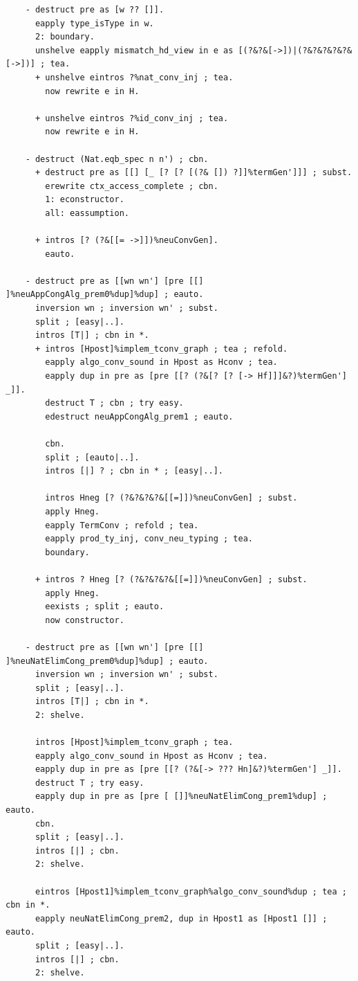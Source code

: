 \begin{lstlisting}
    - destruct pre as [w ?? []].
      eapply type_isType in w.
      2: boundary.
      unshelve eapply mismatch_hd_view in e as [(?&?&[->])|(?&?&?&?&?&[->])] ; tea.
      + unshelve eintros ?%nat_conv_inj ; tea.
        now rewrite e in H.

      + unshelve eintros ?%id_conv_inj ; tea.
        now rewrite e in H.

    - destruct (Nat.eqb_spec n n') ; cbn.
      + destruct pre as [[] [_ [? [? [(?& []) ?]]%termGen']]] ; subst.
        erewrite ctx_access_complete ; cbn.
        1: econstructor.
        all: eassumption.
        
      + intros [? (?&[[= ->]])%neuConvGen].
        eauto.
      
    - destruct pre as [[wn wn'] [pre [[] ]%neuAppCongAlg_prem0%dup]%dup] ; eauto.
      inversion wn ; inversion wn' ; subst.
      split ; [easy|..].
      intros [T|] ; cbn in *.
      + intros [Hpost]%implem_tconv_graph ; tea ; refold.
        eapply algo_conv_sound in Hpost as Hconv ; tea.
        eapply dup in pre as [pre [[? (?&[? [? [-> Hf]]]&?)%termGen'] _]].
        destruct T ; cbn ; try easy.
        edestruct neuAppCongAlg_prem1 ; eauto.

        cbn.
        split ; [eauto|..].
        intros [|] ? ; cbn in * ; [easy|..].

        intros Hneg [? (?&?&?&?&[[=]])%neuConvGen] ; subst.
        apply Hneg.
        eapply TermConv ; refold ; tea.
        eapply prod_ty_inj, conv_neu_typing ; tea.
        boundary.

      + intros ? Hneg [? (?&?&?&?&[[=]])%neuConvGen] ; subst.
        apply Hneg.
        eexists ; split ; eauto.
        now constructor.
  
    - destruct pre as [[wn wn'] [pre [[] ]%neuNatElimCong_prem0%dup]%dup] ; eauto.
      inversion wn ; inversion wn' ; subst.
      split ; [easy|..].
      intros [T|] ; cbn in *.
      2: shelve.

      intros [Hpost]%implem_tconv_graph ; tea.
      eapply algo_conv_sound in Hpost as Hconv ; tea.
      eapply dup in pre as [pre [[? (?&[-> ??? Hn]&?)%termGen'] _]].
      destruct T ; try easy.
      eapply dup in pre as [pre [ []]%neuNatElimCong_prem1%dup] ; eauto.
      cbn.
      split ; [easy|..].
      intros [|] ; cbn.
      2: shelve.

      eintros [Hpost1]%implem_tconv_graph%algo_conv_sound%dup ; tea ; cbn in *.
      eapply neuNatElimCong_prem2, dup in Hpost1 as [Hpost1 []] ; eauto.
      split ; [easy|..].
      intros [|] ; cbn.
      2: shelve.
      

\end{lstlisting}
